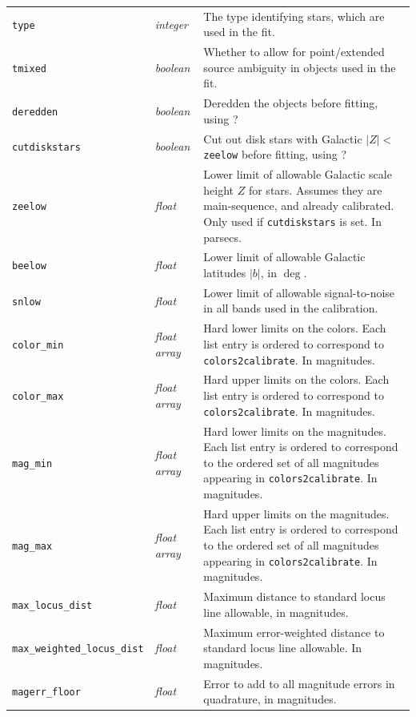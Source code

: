 \documentclass{report}
\begin{document}
\begin{center}
\begin{longtable}{llp{2in}}
\verb|type| & {\it integer} & The type identifying stars, which are used in the fit. \\
\verb|tmixed| & {\it boolean} & Whether to allow for point/extended source ambiguity in objects used in the fit. \\
\verb|deredden| & {\it boolean} & Deredden the objects before fitting, using \citet{bib:sfd}? \\
\verb|cutdiskstars| & {\it boolean} & Cut out disk stars with Galactic $|Z|<$ \verb|zeelow| before fitting, using \citet{bib:juric}?  \\
\verb|zeelow| & {\it float} & Lower limit of allowable Galactic scale height $Z$ for stars. Assumes they are main-sequence, and already calibrated. Only used if \verb|cutdiskstars| is set. In parsecs. \\
\verb|beelow| & {\it float} & Lower limit of allowable Galactic latitudes $|b|$, in $\deg$. \\
\verb|snlow| & {\it float} & Lower limit of allowable signal-to-noise in all bands used in the calibration. \\
\verb|color_min| & {\it float array} & Hard lower limits on the colors. Each list entry is ordered to correspond to \verb|colors2calibrate|. In magnitudes.  \\
\verb|color_max| & {\it float array} & Hard upper limits on the colors. Each list entry is ordered to correspond to \verb|colors2calibrate|.  In magnitudes. \\
\verb|mag_min| & {\it float array} & Hard lower limits on the magnitudes. Each list entry is ordered to correspond to the ordered set of all magnitudes appearing in \verb|colors2calibrate|. In magnitudes.  \\
\verb|mag_max| & {\it float array} & Hard upper limits on the magnitudes. Each list entry is ordered to correspond to the ordered set of all magnitudes appearing in \verb|colors2calibrate|.  In magnitudes. \\
\verb|max_locus_dist| & {\it float} & Maximum distance to standard locus line allowable, in magnitudes.  \\
\verb|max_weighted_locus_dist| & {\it float} & Maximum error-weighted distance to standard locus line allowable. In magnitudes.  \\
\verb|magerr_floor| & {\it float} & Error to add to all magnitude errors in quadrature, in magnitudes.  \\

\end{longtable}
\end{center}
\end{document}
